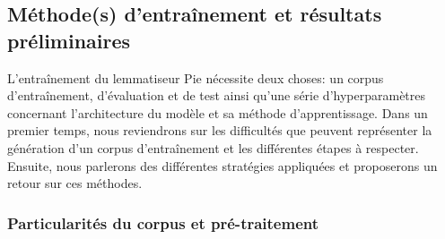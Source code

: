 \subsection{Méthode(s) d'entraînement et résultats préliminaires}

L'entraînement du lemmatiseur Pie nécessite deux choses: un corpus d'entraînement, d'évaluation et de test ainsi qu'une série d'hyperparamètres concernant l'architecture du modèle et sa méthode d'apprentissage. Dans un premier temps, nous reviendrons sur les difficultés que peuvent représenter la génération d'un corpus d'entraînement et les différentes étapes à respecter. Ensuite, nous parlerons des différentes stratégies appliquées et proposerons un retour sur ces méthodes.

\subsubsection{Particularités du corpus et pré-traitement}

